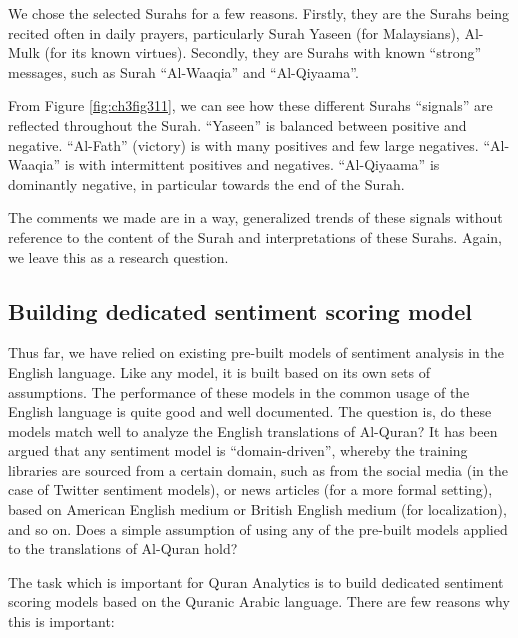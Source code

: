 \documentclass[
]{article}
\begin{document}
We chose the selected Surahs for a few reasons. Firstly, they are the Surahs being recited often in daily prayers, particularly Surah Yaseen (for Malaysians), Al-Mulk (for its known virtues). Secondly, they are Surahs with known ``strong'' messages, such as Surah ``Al-Waaqia'' and ``Al-Qiyaama''.

From Figure \ref{fig:ch3fig311}, we can see how these different Surahs ``signals'' are reflected throughout the Surah. ``Yaseen'' is balanced between positive and negative. ``Al-Fath'' (victory) is with many positives and few large negatives. ``Al-Waaqia'' is with intermittent positives and negatives. ``Al-Qiyaama'' is dominantly negative, in particular towards the end of the Surah.

The comments we made are in a way, generalized trends of these signals without reference to the content of the Surah and interpretations of these Surahs. Again, we leave this as a research question.

\hypertarget{building-dedicated-sentiment-scoring-model}{%
\subsection{Building dedicated sentiment scoring model}\label{building-dedicated-sentiment-scoring-model}}

Thus far, we have relied on existing pre-built models of sentiment analysis in the English language. Like any model, it is built based on its own sets of assumptions. The performance of these models in the common usage of the English language is quite good and well documented. The question is, do these models match well to analyze the English translations of Al-Quran? It has been argued that any sentiment model is ``domain-driven'', whereby the training libraries are sourced from a certain domain, such as from the social media (in the case of Twitter sentiment models), or news articles (for a more formal setting), based on American English medium or British English medium (for localization), and so on. Does a simple assumption of using any of the pre-built models applied to the translations of Al-Quran hold?

The task which is important for Quran Analytics is to build dedicated sentiment scoring models based on the Quranic Arabic language. There are few reasons why this is important:
\end{document}
